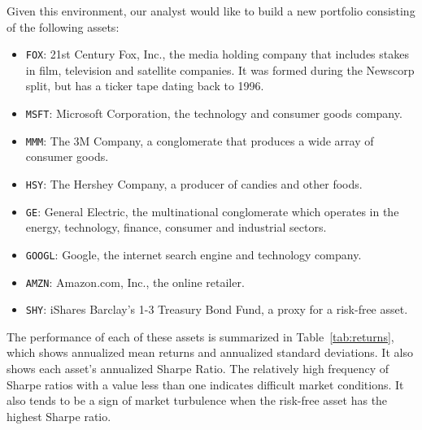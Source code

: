 \documentclass[a4paper]{article}\usepackage[]{graphicx}\usepackage[]{color}
\begin{document}
Given this environment, our analyst would like to build a new portfolio consisting of the following assets:

\begin{itemize}
    \item \texttt{FOX}: 21st Century Fox, Inc., the media holding company that includes stakes in film, television and satellite companies. It was formed during the Newscorp split, but has a ticker tape dating back to 1996.
    \item \texttt{MSFT}: Microsoft Corporation, the technology and consumer goods company.
    \item \texttt{MMM}: The 3M Company, a conglomerate that produces a wide array of consumer goods.
    \item \texttt{HSY}: The Hershey Company, a producer of candies and other foods.
    \item \texttt{GE}: General Electric, the multinational conglomerate which operates in the energy, technology, finance, consumer and industrial sectors.
    \item \texttt{GOOGL}: Google, the internet search engine and technology company.
    \item \texttt{AMZN}: Amazon.com, Inc., the online retailer.
    \item \texttt{SHY}: iShares Barclay's 1-3 Treasury Bond Fund, a proxy for a risk-free asset.
\end{itemize}

The performance of each of these assets is summarized in Table~\ref{tab:returns}, which shows annualized mean returns and annualized standard deviations. It also shows each asset's annualized Sharpe Ratio. The relatively high frequency of Sharpe ratios with a value less than one indicates difficult market conditions. It also tends to be a sign of market turbulence when the risk-free asset has the highest Sharpe ratio. 

\begin{table}
    \centering
\caption{Expected returns, standard deviations and Sharpe ratios for the candidate assets for the various portfolios to be shown below.}
    \label{tab:returns}
\end{table}
\end{document}
